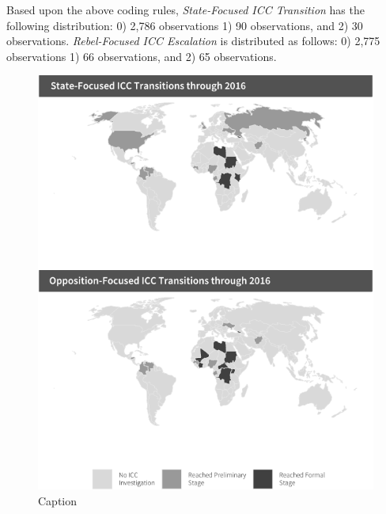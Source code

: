 
Based upon the above coding rules, \emph{State-Focused ICC Transition} has the following distribution: 0) 2,786 observations 1) 90 observations, and 2) 30 observations. \emph{Rebel-Focused ICC Escalation} is distributed as follows: 0) 2,775 observations 1) 66 observations, and 2) 65 observations.

\begin{figure}
    \centering
    \includegraphics[width=1\textwidth]{iccPaper/iccMaps.pdf}
    \caption{Caption}
    \label{fig:iccMaps}
\end{figure}
\FloatBarrier

